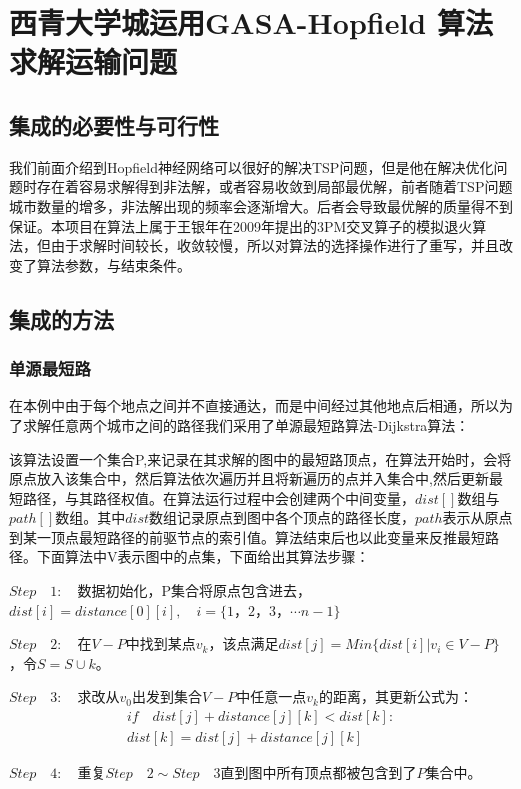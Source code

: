 \chapter{西青大学城运用GASA-Hopfield 算法求解运输问题}
\section{集成的必要性与可行性}
我们前面介绍到Hopfield神经网络可以很好的解决TSP问题，但是他在解决优化问题时存在着容易求解得到非法解，或者容易收敛到局部最优解，前者随着TSP问题城市数量的增多，非法解出现的频率会逐渐增大。后者会导致最优解的质量得不到保证。本项目在算法上属于王银年在2009年提出的3PM交叉算子的模拟退火算法，但由于求解时间较长，收敛较慢，所以对算法的选择操作进行了重写，并且改变了算法参数，与结束条件。
\section{集成的方法}
\label{jcff}%
\subsection{单源最短路}
在本例中由于每个地点之间并不直接通达，而是中间经过其他地点后相通，所以为了求解任意两个城市之间的路径我们采用了单源最短路算法-Dijkstra算法：
\par
该算法设置一个集合P,来记录在其求解的图中的最短路顶点，在算法开始时，会将原点放入该集合中，然后算法依次遍历并且将新遍历的点并入集合中,然后更新最短路径，与其路径权值。在算法运行过程中会创建两个中间变量，$dist[]$数组与$path[]$数组。其中$dist$数组记录原点到图中各个顶点的路径长度，$path$表示从原点到某一顶点最短路径的前驱节点的索引值。算法结束后也以此变量来反推最短路径。下面算法中V表示图中的点集，下面给出其算法步骤：
\par
$Step \quad 1: \quad $数据初始化，P集合将原点包含进去，$dist[i] = distance[0][i],\quad i = \{1，2，3，\cdots n-1\}$
\par
$Step \quad 2: \quad $在$V-P$中找到某点$v_k$，该点满足$dist[j] = Min\{dist[i] | v_i \in V-P\}$，令$S = S \cup {k}$。
\par
$Step \quad 3: \quad $求改从$v_0$出发到集合$V-P$中任意一点$v_k$的距离，其更新公式为：\\
\begin{equation}
    \begin{aligned}
        if \quad dist[j]+ distance[j][k] < dist[k] :\\
        dist[k] = dist[j]+distance[j][k]
    \end{aligned}
\end{equation}
\par
$Step \quad 4: \quad $重复$Step \quad 2 \sim Step \quad 3$直到图中所有顶点都被包含到了$P$集合中。
